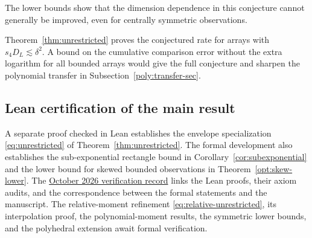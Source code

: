 \documentclass[11pt,letterpaper]{article}
\theoremstyle{remark}
\begin{document}
The lower bounds show that the dimension dependence in this conjecture
cannot generally be improved, even for centrally symmetric observations.


Theorem~\ref{thm:unrestricted} proves the conjectured rate for arrays with $s_4D_L\lesssim\delta^2$. A bound on the cumulative comparison error without the extra logarithm for all bounded arrays would give the full conjecture
and sharpen the polynomial transfer in Subsection~\ref{poly:transfer-sec}.

\subsection{Lean certification of the main result}\label{sec:lean-certification}

A separate proof checked in Lean establishes the envelope specialization \eqref{eq:unrestricted} of Theorem~\ref{thm:unrestricted}.
The formal development also establishes the sub-exponential rectangle
bound in Corollary~\ref{cor:subexponential} and the lower bound for
skewed bounded observations in Theorem~\ref{opt:skew-lower}. The
\href{https://github.com/VC2015/HDCLTs/blob/bbf1ab99c733a398c181ca8c9f5a243a41f258c6/verification/2026-10-21-companion-results/README.md}{October 2026 verification record}
links the Lean proofs, their axiom audits, and the correspondence between
the formal statements and the manuscript. The relative-moment refinement \eqref{eq:relative-unrestricted}, its interpolation proof, the polynomial-moment results, the symmetric lower
bounds, and the polyhedral extension await formal verification.
\end{document}

